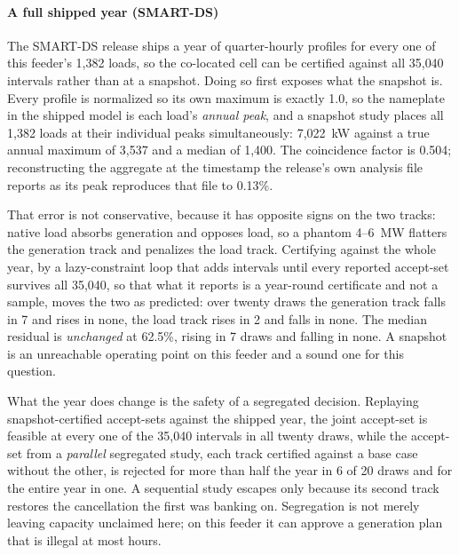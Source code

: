 \documentclass[review,authoryear,12pt]{elsarticle}
\begin{document}
\paragraph{A full shipped year (SMART-DS)}
The SMART-DS release ships a year of quarter-hourly profiles for every one of
this feeder's 1{,}382 loads, so the co-located cell can be certified against all
35{,}040 intervals rather than at a snapshot. Doing so first exposes what the
snapshot is. Every profile is normalized so its own maximum is exactly 1.0, so
the nameplate in the shipped model is each load's \emph{annual peak}, and a
snapshot study places all 1{,}382 loads at their individual peaks
simultaneously: 7{,}022~kW against a true annual maximum of 3{,}537 and a
median of 1{,}400. The coincidence factor is 0.504; reconstructing the
aggregate at the timestamp the release's own analysis file reports as its peak
reproduces that file to 0.13\%.

That error is not conservative, because it has opposite signs on the two
tracks: native load absorbs generation and opposes load, so a phantom 4--6~MW
flatters the generation track and penalizes the load track. Certifying against
the whole year, by a lazy-constraint loop that adds intervals until every
reported accept-set survives all 35{,}040, so that what it reports is a
year-round certificate and not a sample, moves the two as predicted: over twenty
draws the generation track falls in 7 and rises in none, the load track rises
in 2 and falls in none. The median residual is \emph{unchanged} at 62.5\%,
rising in 7 draws and falling in none. A snapshot is an unreachable operating
point on this feeder and a sound one for this question.

What the year does change is the safety of a segregated decision. Replaying
snapshot-certified accept-sets against the shipped year, the joint accept-set
is feasible at every one of the 35{,}040 intervals in all twenty draws, while
the accept-set from a \emph{parallel} segregated study, each track certified
against a base case without the other, is rejected for more than half the
year in 6 of 20 draws and for the entire year in one. A sequential study
escapes only because its second track restores the cancellation the first was
banking on. Segregation is not merely leaving capacity unclaimed here; on this
feeder it can approve a generation plan that is illegal at most hours.
\end{document}
